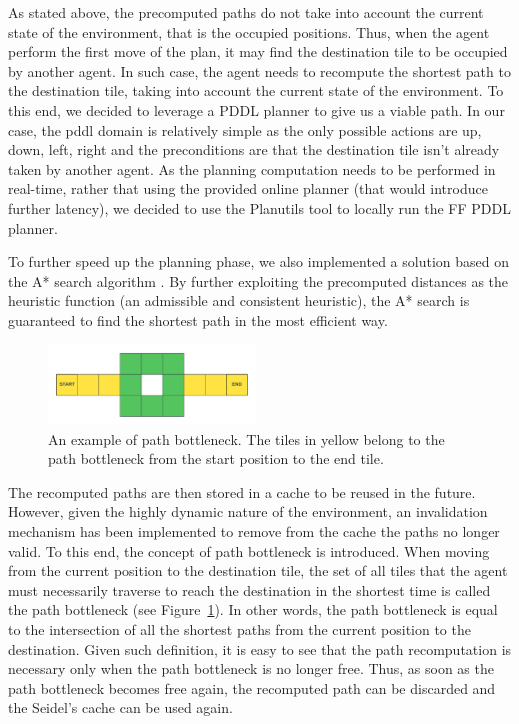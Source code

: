 As stated above, the precomputed paths do not take into account the current state of the environment, that is the occupied positions. Thus, when the agent perform the first move of the plan, it may find the destination tile to be occupied by another agent. In such case, the agent needs to recompute the shortest path to the destination tile, taking into account the current state of the environment. To this end, we decided to leverage a PDDL planner to give us a viable path. In our case, the pddl domain is relatively simple as the only possible actions are up, down, left, right and the preconditions are that the destination tile isn't already taken by another agent. As the planning computation needs to be performed in real-time, rather that using the provided online planner (that would introduce further latency), we decided to use the Planutils tool \parencite{planutils} to locally run the FF PDDL planner.

To further speed up the planning phase, we also implemented a  solution based on the A* search algorithm \parencite{a*}. By further exploiting the precomputed distances as the heuristic function (an admissible and consistent heuristic), the A* search is guaranteed to find the shortest path in the most efficient way.

\begin{figure}
    \centering
    \includegraphics[width=0.49\textwidth]{figures/path-bottleneck.png}
    \caption{An example of path bottleneck. The tiles in yellow belong to the path bottleneck from the start position to the end tile.}
    \label{fig:path-bottleneck}
\end{figure}

The recomputed paths are then stored in a cache to be reused in the future. However, given the highly dynamic nature of the environment, an invalidation mechanism has been implemented to remove from the cache the paths no longer valid. To this end, the concept of path bottleneck is introduced. When moving from the current position to the destination tile, the set of all tiles that the agent must necessarily traverse to reach the destination in the shortest time is called the path bottleneck (see Figure~\ref{fig:path-bottleneck}). In other words, the path bottleneck is equal to the intersection of all the shortest paths from the current position to the destination. Given such definition, it is easy to see that the path recomputation is necessary only when the path bottleneck is no longer free. Thus, as soon as the path bottleneck becomes free again, the recomputed path can be discarded and the Seidel's cache can be used again.
